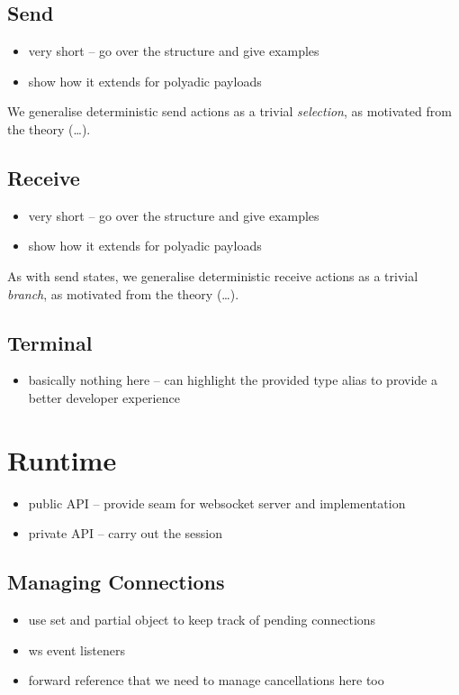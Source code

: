 \subsection{Send}
\begin{itemize}
\item very short -- go over the structure and give examples
\item show how it extends for polyadic payloads
\end{itemize}

We generalise deterministic send actions as a trivial \textit{selection}, 
as motivated from the theory (\dots).

\subsection{Receive}
\begin{itemize}
\item very short -- go over the structure and give examples
\item show how it extends for polyadic payloads
\end{itemize}

As with send states,
we generalise deterministic receive actions as a trivial \textit{branch}, 
as motivated from the theory (\dots).

\subsection{Terminal}
\begin{itemize}
\item basically nothing here -- can highlight the provided type alias to provide a better developer experience
\end{itemize}

\section{Runtime}
\label{section:noderuntime}

\begin{itemize}
\item public API -- provide seam for websocket server and implementation
\item private API -- carry out the session
\end{itemize}

\subsection{Managing Connections}
\begin{itemize}
\item use set and partial object to keep track of pending connections
\item ws event listeners
\item forward reference that we need to manage cancellations here too
\end{itemize}

